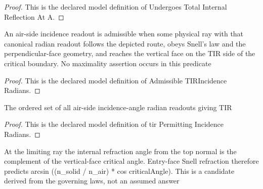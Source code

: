 \begin{proof}
  This is the declared model definition of Undergoes Total Internal Reflection At A.
\end{proof}
\begin{definition}
  \label{def:physics:phyx-mini-0096:phyxminiproblems-problemphyxmini0096-admissibletirincidenceradians}
  An air-side incidence readout is admissible when some physical ray with that canonical radian readout follows the depicted route, obeys Snell's law and the perpendicular-face geometry, and reaches the vertical face on the TIR side of the critical boundary. No maximality assertion occurs in this predicate
\end{definition}
\begin{proof}
  This is the declared model definition of Admissible TIRIncidence Radians.
\end{proof}
\begin{definition}
  \label{def:physics:phyx-mini-0096:phyxminiproblems-problemphyxmini0096-tirpermittingincidenceradians}
  The ordered set of all air-side incidence-angle radian readouts giving TIR
\end{definition}
\begin{proof}
  This is the declared model definition of tir Permitting Incidence Radians.
\end{proof}
\begin{definition}
  \label{def:physics:phyx-mini-0096:phyxminiproblems-problemphyxmini0096-predictedmaximumairincidenceangle}
  At the limiting ray the internal refraction angle from the top normal is the complement of the vertical-face critical angle. Entry-face Snell refraction therefore predicts arcsin ((n\_solid / n\_air) * cos criticalAngle). This is a candidate derived from the governing laws, not an assumed answer
\end{definition}
